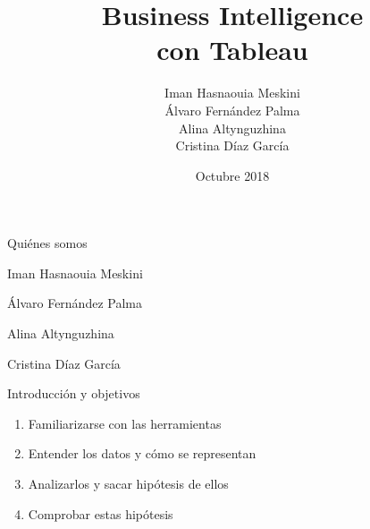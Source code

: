 \documentclass{beamer}
\title{Business Intelligence \\con Tableau}
\author{Iman Hasnaouia Meskini\\ Álvaro Fernández Palma\\ Alina Altynguzhina \\ Cristina Díaz García}
\institute{Introducción a los Sistemas de Información}
\date{Octubre 2018}
\begin{document}

\begin{frame}
	\maketitle %
\end{frame}




\begin{frame}{Quiénes somos}

	Iman Hasnaouia Meskini
	
	Álvaro Fernández Palma
	
	Alina Altynguzhina
	
	Cristina Díaz García
	
\end{frame}




\begin{frame}{Introducción y objetivos}

\begin{enumerate}
	\item Familiarizarse con las herramientas
	\item Entender los datos y cómo se representan
	\item Analizarlos y sacar hipótesis de ellos
	\item Comprobar estas hipótesis
	\end{enumerate}
	
\end{frame}
\end{document}
